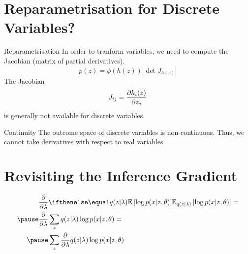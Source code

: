 \documentclass[14pt]{beamer}
\begin{document}
\begin{frame}
\tableofcontents
\end{frame}

\section{Reparametrisation for Discrete Variables?}
\begin{frame}
\tableofcontents[currentsection]
\end{frame}

\begin{frame}{Reparametrisation}
In order to tranform variables, we need to compute the Jacobian (matrix of partial derivatives).
\begin{equation*}
p(z) = \phi(h(z))\left|\det J_{h(z)}\right|
\end{equation*}
The Jacobian 
\begin{equation}
	J_{ij} = \pdv{h_i(z)}{z_j}
\end{equation}
is generally not available for discrete variables. 
\end{frame}


\begin{frame}{Continuity}
The outcome space of discrete variables is non-continuous. Thus, we cannot take derivatives with
respect to real variables. 
\end{frame}

\section{Revisiting the Inference Gradient}
\begin{frame}
\tableofcontents[currentsection]
\end{frame}

\begin{frame}
\begin{equation*}
\begin{aligned}
\frac{\partial}{\partial \lambda}&\E[q(z|\lambda)]{\log p(x|z,\theta)} = \\
\pause
\frac{\partial}{\partial \lambda}&\sum_{z} q(z|\lambda) \log p(x|z,\theta) = \\
\pause
&\sum_{z}\frac{\partial}{\partial \lambda} q(z|\lambda) \log p(x|z,\theta)
\end{aligned}
\end{equation*}
\end{frame}
\end{document}
